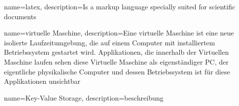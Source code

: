 {
    name=latex,
    description={Is a markup language specially suited 
    for scientific documents}
}

{
    name=virtuelle Maschine,
    description={Eine virtuelle Maschine ist eine neue isolierte Laufzeitumgebung, die auf einem Computer mit installiertem Betriebssystem gestartet wird. Applikationen, die innerhalb der Virtuellen Maschine laufen sehen diese Virtuelle Maschine als eigenständiger PC, der eigentliche physikalische Computer und dessen Betriebssystem ist für diese Applikationen unsichtbar}
}

{
    name=Key-Value Storage,
    description={beschreibung}
}